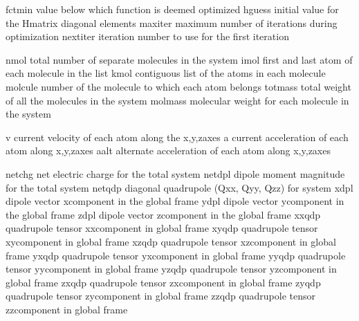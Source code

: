 \documentclass[letterpaper,11pt,english]{sphinxmanual}
\begin{document}

\begin{sphinxVerbatim}[commandchars=\\\{\}]
fctmin          value below which function is deemed optimized
hguess          initial value for the H\PYGZhy{}matrix diagonal elements
maxiter         maximum number of iterations during optimization
nextiter        iteration number to use for the first iteration
\end{sphinxVerbatim}


\begin{sphinxVerbatim}[commandchars=\\\{\}]
nmol            total number of separate molecules in the system
imol            first and last atom of each molecule in the list
kmol            contiguous list of the atoms in each molecule
molcule         number of the molecule to which each atom belongs
totmass         total weight of all the molecules in the system
molmass         molecular weight for each molecule in the system
\end{sphinxVerbatim}


\begin{sphinxVerbatim}[commandchars=\\\{\}]
v               current velocity of each atom along the x,y,z\PYGZhy{}axes
a               current acceleration of each atom along x,y,z\PYGZhy{}axes
aalt            alternate acceleration of each atom along x,y,z\PYGZhy{}axes
\end{sphinxVerbatim}


\begin{sphinxVerbatim}[commandchars=\\\{\}]
netchg          net electric charge for the total system
netdpl          dipole moment magnitude for the total system
netqdp          diagonal quadrupole (Qxx, Qyy, Qzz) for system
xdpl            dipole vector x\PYGZhy{}component in the global frame
ydpl            dipole vector y\PYGZhy{}component in the global frame
zdpl            dipole vector z\PYGZhy{}component in the global frame
xxqdp           quadrupole tensor xx\PYGZhy{}component in global frame
xyqdp           quadrupole tensor xy\PYGZhy{}component in global frame
xzqdp           quadrupole tensor xz\PYGZhy{}component in global frame
yxqdp           quadrupole tensor yx\PYGZhy{}component in global frame
yyqdp           quadrupole tensor yy\PYGZhy{}component in global frame
yzqdp           quadrupole tensor yz\PYGZhy{}component in global frame
zxqdp           quadrupole tensor zx\PYGZhy{}component in global frame
zyqdp           quadrupole tensor zy\PYGZhy{}component in global frame
zzqdp           quadrupole tensor zz\PYGZhy{}component in global frame
\end{sphinxVerbatim}
\end{document}
